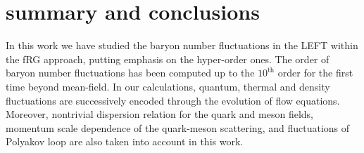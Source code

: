 \documentclass[%
reprint,
superscriptaddress,
showpacs,preprintnumbers,
 amsmath,amssymb,
 aps,
prd,
]{revtex4-1}
\def\Fig#1{Fig.~\ref{#1}} \def\Tab#1{Tab.~\ref{#1}}
\def\Eq#1{Eq.~(\ref{#1})}
\begin{document}



\section{summary and conclusions}
\label{sec:summary}

In this work we have studied the baryon number fluctuations in the LEFT within the fRG approach, putting emphasis on the hyper-order ones. The order of baryon number fluctuations has been computed up to the $10^{\mathrm{th}}$ order for the first time beyond mean-field. In our calculations, quantum, thermal and density fluctuations are successively encoded through the evolution of flow equations. Moreover, nontrivial dispersion relation for the quark and meson fields, momentum scale dependence of the quark-meson scattering, and fluctuations of Polyakov loop are also taken into account in this work.
\end{document}
